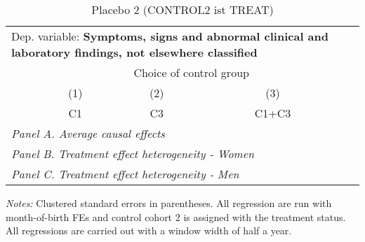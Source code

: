  \begin{table}[H] \centering \begin{threeparttable} \caption{Placebo 2 (CONTROL2 ist TREAT) } {\def\sym#1{\ifmmode^{#1}\else\(^{#1}\)\fi} \begin{tabular}{l*{4}{c}} \toprule \multicolumn{4}{l}{Dep. variable: \textbf{Symptoms, signs and abnormal clinical and laboratory findings, not elsewhere classified}} \\ & \multicolumn{3}{c}{Choice of control group} \\ \cmidrule(lr){2-4}
            &\multicolumn{1}{c}{(1)}&\multicolumn{1}{c}{(2)}&\multicolumn{1}{c}{(3)}\\
            &\multicolumn{1}{c}{C1}&\multicolumn{1}{c}{C3}&\multicolumn{1}{c}{C1+C3}\\
\midrule
 \multicolumn{4}{l}{\emph{Panel A. Average causal effects}} \\      \midrule\multicolumn{4}{l}{\emph{Panel B. Treatment effect heterogeneity - Women}} \\      \midrule\multicolumn{4}{l}{\emph{Panel C. Treatment effect heterogeneity - Men}} \\      
\bottomrule \end{tabular} } \begin{tablenotes} \item \scriptsize \emph{Notes:} Clustered standard errors in parentheses. All regression are run with month-of-birth FEs and control cohort 2 is assigned with the treatment status. All regressions are carried out with a window width of half a year. \end{tablenotes} \end{threeparttable} \end{table} 
